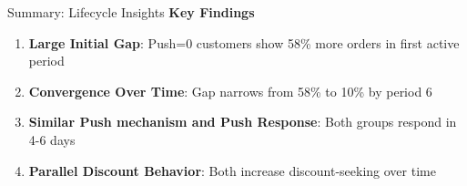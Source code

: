 \documentclass[aspectratio=169]{beamer}  %
\begin{document}
\begin{frame}{Summary: Lifecycle Insights}
\textbf{Key Findings}
\begin{enumerate}
    \item \textbf{Large Initial Gap}: Push=0 customers show 58\% more orders in first active period
    \item \textbf{Convergence Over Time}: Gap narrows from 58\% to 10\% by period 6
    \item \textbf{Similar Push mechanism and Push Response}: Both groups respond in 4-6 days
    \item \textbf{Parallel Discount Behavior}: Both increase discount-seeking over time
\end{enumerate}

\end{frame}
\end{document}
